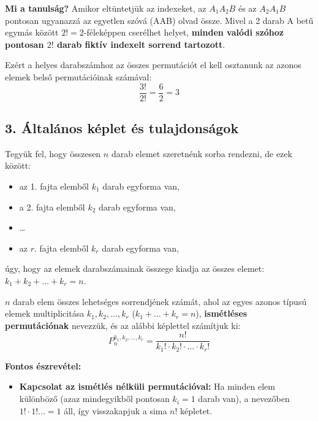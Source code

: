 \documentclass[11pt, a4paper]{article}
\begin{document}
\vspace{0.2cm}
\noindent\textbf{Mi a tanulság?}
Amikor eltüntetjük az indexeket, az $A_1 A_2 B$ és az $A_2 A_1 B$ pontosan ugyanazzá az egyetlen szóvá (AAB) olvad össze. Mivel a 2 darab A betű egymás között $2! = 2$-féleképpen cserélhet helyet, \textbf{minden valódi szóhoz pontosan $2!$ darab fiktív indexelt sorrend tartozott}.

Ezért a helyes darabszámhoz az összes permutációt el kell osztanunk az azonos elemek belső permutációinak számával:
\[
\frac{3!}{2!} = \frac{6}{2} = 3
\]





\subsection*{3. Általános képlet és tulajdonságok}
Tegyük fel, hogy összesen $n$ darab elemet szeretnénk sorba rendezni, de ezek között:
\begin{itemize}
    \item az 1. fajta elemből $k_1$ darab egyforma van,
    \item a 2. fajta elemből $k_2$ darab egyforma van,
    \item \dots
    \item az $r$. fajta elemből $k_r$ darab egyforma van,
\end{itemize}
úgy, hogy az elemek darabszámainak összege kiadja az összes elemet: $k_1 + k_2 + \ldots + k_r = n$.

\vspace{0.2cm}
\begin{tcolorbox}[colback=blue!5!white, colframe=blue!75!black, title=\textbf{Definíció és képlet (Ismétléses permutáció)}]
$n$ darab elem összes lehetséges sorrendjének számát, ahol az egyes azonos típusú elemek multiplicitása $k_1, k_2, \ldots, k_r$ ($k_1 + \dots + k_r = n$), \textbf{ismétléses permutációnak} nevezzük, és az alábbi képlettel számítjuk ki:
\[
P_n^{k_1, k_2, \ldots, k_r} = \frac{n!}{k_1! \cdot k_2! \cdot \ldots \cdot k_r!}
\]
\end{tcolorbox}

\vspace{0.2cm}
\noindent\textbf{Fontos észrevétel:}
\begin{itemize}
    \item \textbf{Kapcsolat az ismétlés nélküli permutációval:} Ha minden elem különböző (azaz mindegyikből pontosan $k_i = 1$ darab van), a nevezőben $1! \cdot 1! \dots = 1$ áll, így visszakapjuk a sima $n!$ képletet.
\end{itemize}
\end{document}
